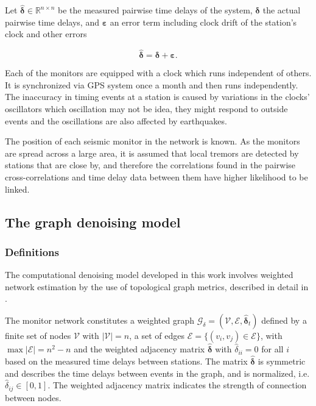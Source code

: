 \documentclass[12pt, sumlimits, intlimits]{article}
\begin{document}
Let $\bm{\hat{\delta}} \in \mathbb{R}^{n\times n}$ be the measured pairwise time delays of the system, $\bm{\delta}$ the actual pairwise time delays, and $\bm{\varepsilon}$ an error term including clock drift of the station's clock and other errors

\begin{equation}
\bm{\hat{\delta}}  = \bm{\delta} + \bm{\varepsilon}.
\label{eq:model}
\end{equation}

Each of the monitors are equipped with a clock which runs independent of others. It is synchronized via GPS system once a month and then runs independently. The inaccuracy in timing events at a station is caused by variations in the clocks' oscillators which oscillation may not be idea, they might respond to outside events and the oscillations are also affected by earthquakes. 

The position of each seismic monitor in the network is known. As the monitors are spread across a large area, it is assumed that local tremors are detected by stations that are close by, and therefore the correlations found in the pairwise cross-correlations and time delay data between them have higher likelihood to be linked. 

\subsection{The graph denoising model}\label{sec:denoising}
\subsubsection{Definitions}
The computational denoising model developed in this work involves weighted network estimation by the use of topological graph metrics, described in detail in \cite{Spyrou2017}. 

The monitor network constitutes a weighted graph $\mathcal{G}_{\delta} = (\mathcal{V}, \mathcal{E}, \bm{\hat{\delta}}_t)$ defined by a finite set of nodes $\mathcal{V}$ with $|\mathcal{V}| = n$, a set of edges $\mathcal{E} = \{ (v_i,v_j) \in \mathcal{E} \}$, with $\max |\mathcal{E}| = n^2-n$ and the weighted adjacency matrix $\bm{\hat{\delta}}$ with $\hat{\delta}_{ii} = 0$ for all $i$ based on the measured time delays between stations. The matrix $\bm{\hat{\delta}}$  is symmetric and describes the time delays between events in the graph, and is normalized, i.e. $\hat{\delta}_{ij}\in [0,1]$. The weighted adjacency matrix indicates the strength of connection between nodes.
\end{document}
